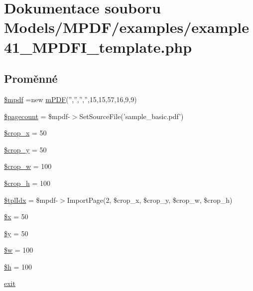 \hypertarget{example41___m_p_d_f_i__template_8php}{\section{Dokumentace souboru Models/\-M\-P\-D\-F/examples/example41\-\_\-\-M\-P\-D\-F\-I\-\_\-template.php}
\label{example41___m_p_d_f_i__template_8php}
}
\subsection*{Proměnné}
\begin{DoxyCompactItemize}
\item 
\hyperlink{example41___m_p_d_f_i__template_8php_ad028f81910d6cbab9b184d2214b3a8f8}{\$mpdf} =new \hyperlink{classm_p_d_f}{m\-P\-D\-F}('','','','',15,15,57,16,9,9)
\item 
\hyperlink{example41___m_p_d_f_i__template_8php_a905390c82ddf2d57cc0c524f4e5b0425}{\$pagecount} = \$mpdf-\/$>$Set\-Source\-File('sample\-\_\-basic.\-pdf')
\item 
\hyperlink{example41___m_p_d_f_i__template_8php_a61d0a2f7a16974228a10fc21d588c1d3}{\$crop\-\_\-x} = 50
\item 
\hyperlink{example41___m_p_d_f_i__template_8php_a732cfa94d9525477ce702fb63383c295}{\$crop\-\_\-y} = 50
\item 
\hyperlink{example41___m_p_d_f_i__template_8php_a02611a68d4ceff645e8bdfaf542d2639}{\$crop\-\_\-w} = 100
\item 
\hyperlink{example41___m_p_d_f_i__template_8php_a1e8e7a49d522c94ac4195588cfdbad23}{\$crop\-\_\-h} = 100
\item 
\hyperlink{example41___m_p_d_f_i__template_8php_a63a522b26f0a84495327fd182ea3e2b3}{\$tpl\-Idx} = \$mpdf-\/$>$Import\-Page(2, \$crop\-\_\-x, \$crop\-\_\-y, \$crop\-\_\-w, \$crop\-\_\-h)
\item 
\hyperlink{example41___m_p_d_f_i__template_8php_af3a16c5f0dd7a74cf9acf6a49fff73a7}{\$x} = 50
\item 
\hyperlink{example41___m_p_d_f_i__template_8php_a77b973d137fb33212e018b042df6e3e7}{\$y} = 50
\item 
\hyperlink{example41___m_p_d_f_i__template_8php_ae51391055f5e898dc2625d155b016aaa}{\$w} = 100
\item 
\hyperlink{example41___m_p_d_f_i__template_8php_ab00da9d5d8bd5b6b944793e093860aff}{\$h} = 100
\item 
\hyperlink{example41___m_p_d_f_i__template_8php_a6733eb5f605d09eaede9845835d71c4e}{exit}
\end{DoxyCompactItemize}


